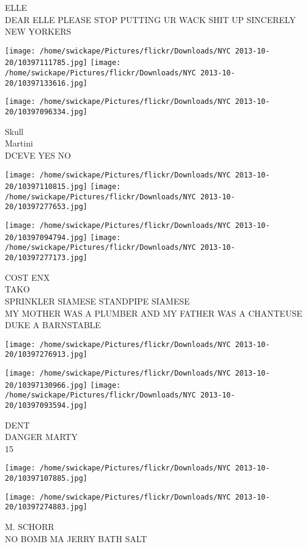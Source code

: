 \documentclass[10pt,letterpaper]{article}
\begin{document}
ELLE\\
DEAR ELLE PLEASE STOP PUTTING UR WACK SHIT UP SINCERELY NEW YORKERS
\pagebreak

\texttt{[image: /home/swickape/Pictures/flickr/Downloads/NYC 2013-10-20/10397111785.jpg]}
\texttt{[image: /home/swickape/Pictures/flickr/Downloads/NYC 2013-10-20/10397133616.jpg]}

\vspace{0.25in}
\texttt{[image: /home/swickape/Pictures/flickr/Downloads/NYC 2013-10-20/10397096334.jpg]}

Skull\\
Martini\\
DCEVE YES NO
\pagebreak

\texttt{[image: /home/swickape/Pictures/flickr/Downloads/NYC 2013-10-20/10397110815.jpg]}
\texttt{[image: /home/swickape/Pictures/flickr/Downloads/NYC 2013-10-20/10397277653.jpg]}

\texttt{[image: /home/swickape/Pictures/flickr/Downloads/NYC 2013-10-20/10397094794.jpg]}
\texttt{[image: /home/swickape/Pictures/flickr/Downloads/NYC 2013-10-20/10397277173.jpg]}

COST ENX\\
TAKO\\
SPRINKLER SIAMESE STANDPIPE SIAMESE\\
MY MOTHER WAS A PLUMBER AND MY FATHER WAS A CHANTEUSE DUKE A BARNSTABLE
\pagebreak

\texttt{[image: /home/swickape/Pictures/flickr/Downloads/NYC 2013-10-20/10397276913.jpg]}

\vspace{0.25in}
\texttt{[image: /home/swickape/Pictures/flickr/Downloads/NYC 2013-10-20/10397130966.jpg]}
\texttt{[image: /home/swickape/Pictures/flickr/Downloads/NYC 2013-10-20/10397093594.jpg]}

DENT\\
DANGER MARTY\\
15
\pagebreak

\texttt{[image: /home/swickape/Pictures/flickr/Downloads/NYC 2013-10-20/10397107885.jpg]}

\vspace{0.25in}
\texttt{[image: /home/swickape/Pictures/flickr/Downloads/NYC 2013-10-20/10397274883.jpg]}

M. SCHORR\\
NO BOMB MA JERRY BATH SALT
\pagebreak
\end{document}
